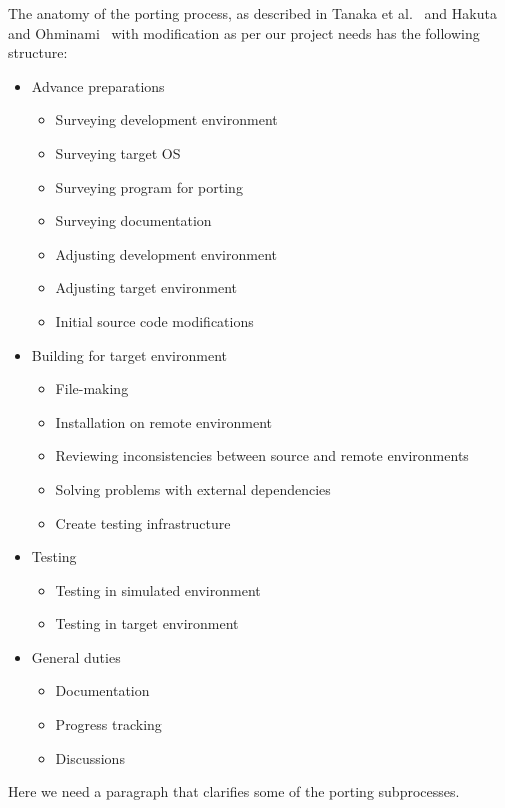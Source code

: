 The anatomy of the porting process, as described in Tanaka et al.~\cite{b1}
and Hakuta and Ohminami~\cite{b2} with modification as per our
project needs has the following structure:
\begin{itemize}
    \item Advance preparations
        \begin{itemize}
            \item Surveying development environment
            \item Surveying target OS
            \item Surveying program for porting
            \item Surveying documentation
            \item Adjusting development environment
            \item Adjusting target environment
            \item Initial source code modifications
        \end{itemize}
    \item Building for target environment
        \begin{itemize}
            \item File-making
            \item Installation on remote environment
            \item Reviewing inconsistencies between source and remote environments
            \item Solving problems with external dependencies
            \item Create testing infrastructure
        \end{itemize}
    \item Testing
        \begin{itemize}
            \item Testing in simulated environment
            \item Testing in target environment
        \end{itemize}
    \item General duties
        \begin{itemize}
            \item Documentation
            \item Progress tracking
            \item Discussions
        \end{itemize}
\end{itemize}

Here we need a paragraph that clarifies some of the porting subprocesses.

